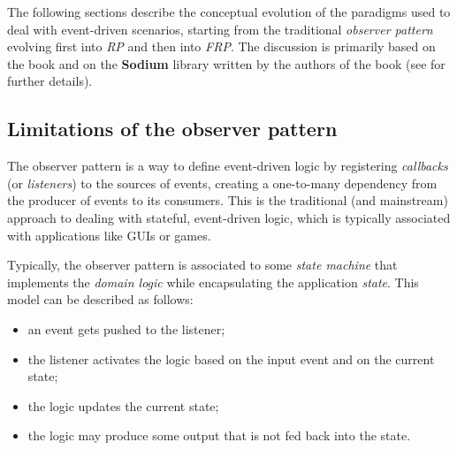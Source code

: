The following sections describe the conceptual evolution of the paradigms used to deal with event-driven scenarios, starting from the traditional \textit{observer pattern} evolving first into \textit{RP} and then into \textit{FRP}.
%
The discussion is primarily based on the book \cite{blackheath2016functional} and on the \textbf{Sodium} library written by the authors of the book (see  for further details).

\subsection{Limitations of the observer pattern}

The observer pattern is a way to define event-driven logic by registering \textit{callbacks} (or \textit{listeners}) to the sources of events, creating a one-to-many dependency from the producer of events to its consumers.
%
This is the traditional (and mainstream) approach to dealing with stateful, event-driven logic, which is typically associated with applications like GUIs or games.

Typically, the observer pattern is associated to some \textit{state machine} that implements the \textit{domain logic} while encapsulating the application \textit{state}.
%
This model can be described as follows:
%
\begin{itemize}
    \item an event gets pushed to the listener;
    \item the listener activates the logic based on the input event and on the current state;
    \item the logic updates the current state;
    \item the logic may produce some output that is not fed back into the state.
\end{itemize}

